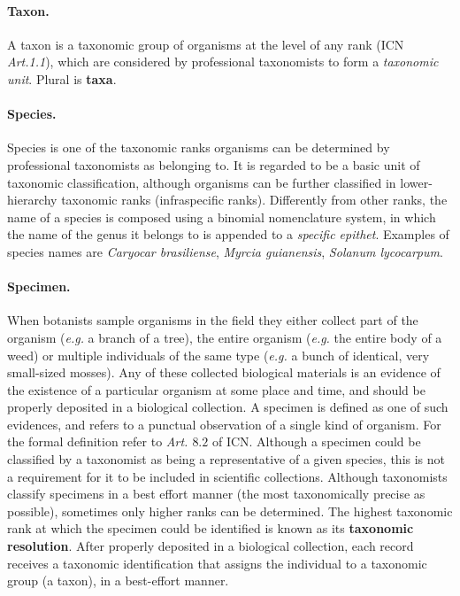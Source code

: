 \paragraph*{Taxon.}
A taxon is a taxonomic group of organisms at the level of any rank (ICN \textit{Art.1.1}), which are considered by professional taxonomists to form a \textit{taxonomic unit}. Plural is \textbf{taxa}.

\paragraph*{Species.}
Species is one of the taxonomic ranks organisms can be determined by professional taxonomists as belonging to. It is regarded to be a basic unit of taxonomic classification, although organisms can be further classified in lower-hierarchy taxonomic ranks (infraspecific ranks).
Differently from other ranks, the name of a species is composed using a binomial nomenclature system, in which the name of the genus it belongs to is appended to a \textit{specific epithet}.
Examples of species names are \textit{Caryocar brasiliense}, \textit{Myrcia guianensis}, \textit{Solanum lycocarpum}.

\paragraph*{Specimen.}
When botanists sample organisms in the field they either collect part of the organism (\textit{e.g.} a branch of a tree), the entire organism (\textit{e.g.} the entire body of a weed) or multiple individuals of the same type (\textit{e.g.} a bunch of identical, very small-sized mosses). 
Any of these collected biological materials is an evidence of the existence of a particular organism at some place and time, and should be properly deposited in a biological collection. A specimen is defined as one of such evidences, and refers to a punctual observation of a single kind of organism. For the formal definition refer to \textit{Art. $8.2$} of ICN. 
Although a specimen could be classified by a taxonomist as being a representative of a given species, this is not a requirement for it to be included in scientific collections. Although taxonomists classify specimens in a best effort manner (the most taxonomically precise as possible), sometimes only higher ranks can be determined. The highest taxonomic rank at which the specimen could be identified is known as its \textbf{taxonomic resolution}.
After properly deposited in a biological collection, each record receives a taxonomic identification that assigns the individual to a taxonomic group (a taxon), in a best-effort manner.







